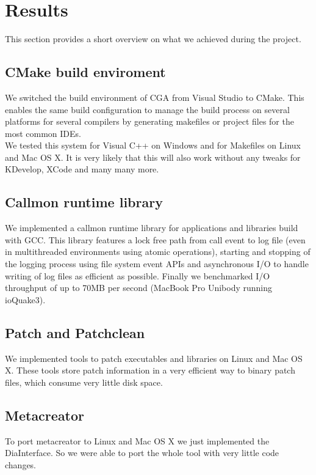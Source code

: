 
\section{Results}

This section provides a short overview on what we achieved during the project.

\subsection{CMake build enviroment} We switched the build environment of CGA from Visual Studio to CMake. This enables the same build configuration to manage the build process on several platforms for several compilers by generating makefiles or project files  for the most common IDEs.\\

We tested this system for Visual C++ on Windows and for Makefiles on Linux and Mac OS X. It is very likely that this will also work without any tweaks for KDevelop, XCode and many many more.

\subsection{Callmon runtime library} We implemented a callmon runtime library for applications and libraries build with GCC. This library features a lock free path from call event to log file (even in multithreaded environments using atomic operations), starting and stopping of the logging process using file system event APIs and asynchronous I/O to handle writing of log files as efficient as possible. Finally we benchmarked I/O throughput of up to 70MB per second (MacBook Pro Unibody running ioQuake3).

\subsection{Patch and Patchclean} We implemented tools to patch executables and libraries on Linux and Mac OS X. These tools store patch information in a very efficient way to binary patch files, which consume very little disk space.


\subsection{Metacreator} To port metacreator to Linux and Mac OS X we just implemented the DiaInterface. So we were able to port the whole tool with very little code changes.\\

